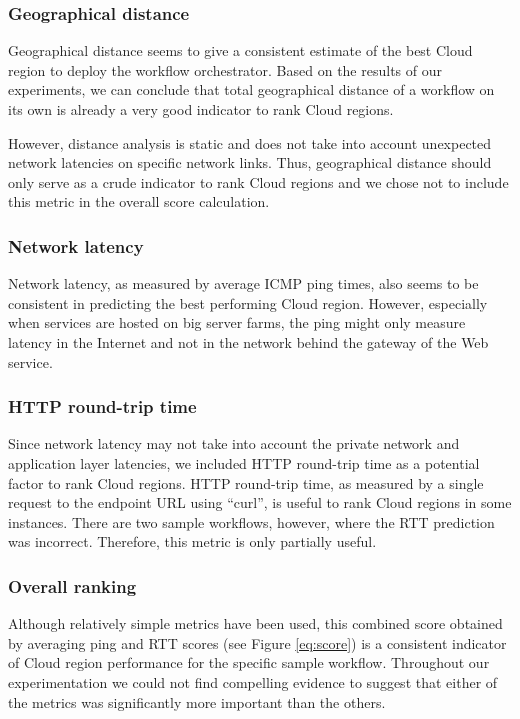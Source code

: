 \documentclass[10pt, conference, compsocconf]{IEEEtran}
\begin{document}
\subsubsection{Geographical distance}
Geographical distance seems to give a consistent estimate of the best Cloud region to deploy the workflow orchestrator. Based on the results of our experiments, we can conclude that total geographical distance of a workflow on its own is already a very good indicator to rank Cloud regions.

However, distance analysis is static and does not take into account unexpected network latencies on specific network links. Thus, geographical distance should only serve as a crude indicator to rank Cloud regions and we chose not to include this metric in the overall score calculation.

\subsubsection{Network latency}
Network latency, as measured by average ICMP ping times, also seems to be consistent in predicting the best performing Cloud region. However, especially when services are hosted on big server farms, the ping might only measure latency in the Internet and not in the network behind the gateway of the Web service.


\subsubsection{HTTP round-trip time}
Since network latency may not take into account the private network and application layer latencies, we included HTTP round-trip time as a potential factor to rank Cloud regions.
HTTP round-trip time, as measured by a single request to the endpoint URL using ``curl'', is useful to rank Cloud regions in some instances. There are two sample workflows, however, where the RTT prediction was incorrect. Therefore, this metric is only partially useful.

\subsubsection{Overall ranking}

Although relatively simple metrics have been used, this combined score obtained by averaging ping and RTT scores (see Figure \ref{eq:score}) is a consistent indicator of Cloud region performance for the specific sample workflow. Throughout our experimentation we could not find compelling evidence to suggest that either of the metrics was significantly more important than the others.
\end{document}
